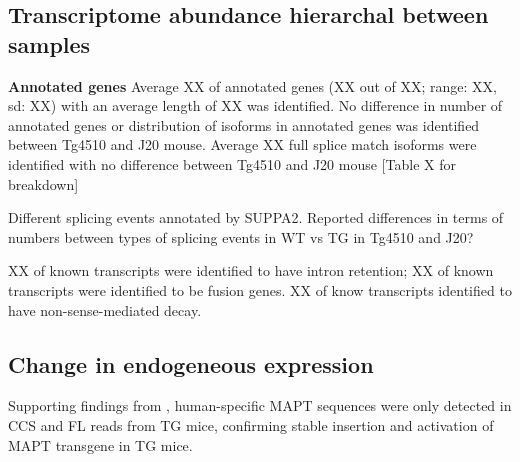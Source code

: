 
\subsection{Transcriptome abundance hierarchal between samples}
\textbf{Annotated genes}
Average XX of annotated genes (XX out of XX; range: XX, sd: XX) with an average length of XX was identified. No difference in number of annotated genes or distribution of isoforms in annotated genes was identified between Tg4510 and J20 mouse. Average XX full splice match isoforms were identified with no difference between Tg4510 and J20 mouse [Table X for breakdown]

Different splicing events annotated by SUPPA2. Reported differences in terms of numbers between types of splicing events in WT vs TG in Tg4510 and J20?

XX of known transcripts were identified to have intron retention; XX of known transcripts were identified to be fusion genes. XX of know transcripts identified to have non-sense-mediated decay. 


\subsection{Change in endogeneous expression}
Supporting findings from \cite{Castanho2020}, human-specific MAPT sequences were only detected in CCS and FL reads from TG mice, confirming stable insertion and activation of MAPT transgene in TG mice. 

